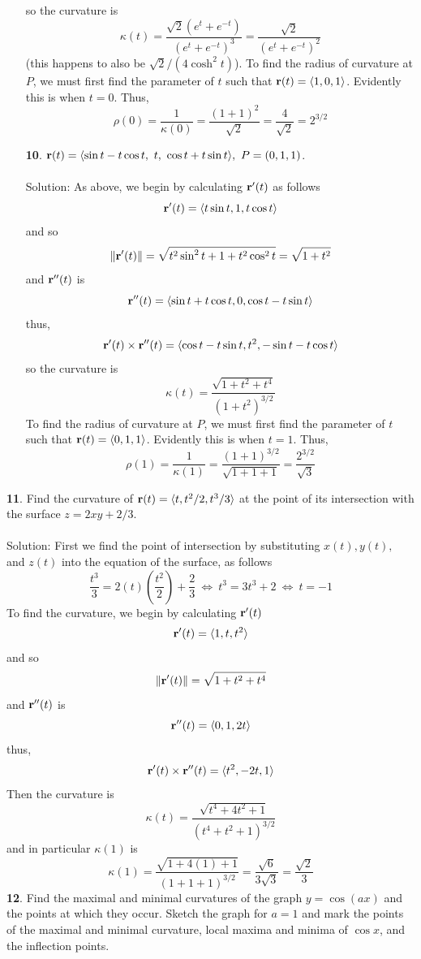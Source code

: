 \documentclass[12pt]{amsbook}
\newcommand{\la}{\langle}
\newcommand{\ra}{\rangle}
\begin{document}
\begin{enumerate}
  so the curvature is
  $$\kappa(t)=\frac{\sqrt{2}(e^t+e^{-t})}{(e^t+e^{-t})^3}=\frac{\sqrt{2}}{(e^t+e^{-t})^2}$$
  (this happens to also be $\sqrt{2}/(4\cosh^2 t)$). To find the radius of curvature at $P$, we must first find the parameter of $t$ such that ${\bf r}(t)=\la 1,0,1 \ra$. Evidently this is when $t=0$. Thus,
  $$\rho(0)=\frac{1}{\kappa(0)}=\frac{(1+1)^2}{\sqrt{2}}=\frac{4}{\sqrt{2}}=2^{3/2}$$
  \item[{\small\bf 10}.] ${\bf r}(t)=\la \sin t-t\cos t,\ t,\ \cos t+t\sin t\ra, \ P=(0,1,1)$.
  \\
  \\
  {\sc Solution}: As above, we begin by calculating ${\bf r}'(t)$ as follows
  $${\bf r}'(t)=\la t\sin t, 1, t\cos t \ra$$
  and so 
  $$\|{\bf r}'(t)\|=\sqrt{t^2\sin^2t+1+t^2\cos^2t}=\sqrt{1+t^2}$$
  and ${\bf r}''(t)$ is
  $${\bf r}''(t)=\la \sin t +t\cos t, 0, \cos t-t\sin t\ra$$
  thus,
  $${\bf r}'(t)\times{\bf r}''(t)=\la \cos t -t\sin t, t^2, -\sin t-t\cos t\ra$$
  so the curvature is
  $$\kappa(t)=\frac{\sqrt{1+t^2+t^4}}{(1+t^2)^{3/2}}$$
  To find the radius of curvature at $P$, we must first find the parameter of $t$ such that ${\bf r}(t)=\la 0,1,1 \ra$. Evidently this is when $t=1$. Thus,
  $$\rho(1)=\frac{1}{\kappa(1)}=\frac{(1+1)^{3/2}}{\sqrt{1+1+1}}=\frac{2^{3/2}}{\sqrt{3}}$$
\end{enumerate}
{\small\bf 11}. Find the curvature of ${\bf r}(t)=\la t, t^2/2, t^3/3 \ra$ at the point of its intersection with the surface $z=2xy+2/3$.
\\
\\
{\sc Solution}: First we find the point of intersection by substituting $x(t), y(t),$ and $z(t)$ into the equation of the surface, as follows
$$\frac{t^3}{3}=2(t)(\frac{t^2}{2})+\frac{2}{3} \ \Leftrightarrow \ t^3=3t^3+2 \ \Leftrightarrow \ t=-1$$
To find the curvature, we begin by calculating ${\bf r}'(t)$
$${\bf r}'(t) = \la 1,t, t^2 \ra$$
and so
$$\|{\bf r}'(t)\|=\sqrt{1+t^2+t^4}$$
and ${\bf r}''(t)$ is 
$${\bf r}''(t) = \la 0,1, 2t \ra$$
thus,
$${\bf r}'(t)\times {\bf r}''(t) = \la t^2, -2t, 1 \ra$$
Then the curvature is
$$\kappa(t)=\frac{\sqrt{t^4+4t^2+1}}{(t^4+t^2+1)^{3/2}}$$
and in particular $\kappa(1)$ is 
$$\kappa(1)=\frac{\sqrt{1+4(1)+1}}{(1+1+1)^{3/2}}=\frac{\sqrt{6}}{3\sqrt{3}}=\frac{\sqrt{2}}{3}$$
{\small\bf 12}. Find the maximal and minimal curvatures of the graph $y = \cos(ax)$ and
the points at which they occur. Sketch the graph for $a = 1$ and mark the points of the maximal and minimal curvature, local maxima and minima of
$\cos x$, and the inflection points.
\end{document}
